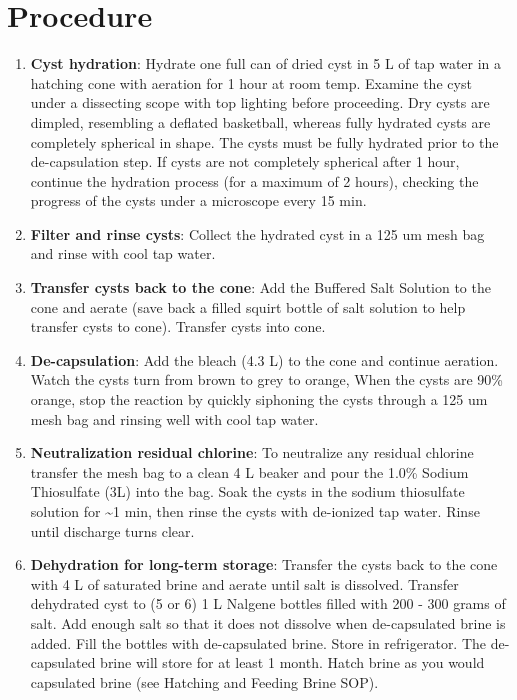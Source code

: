 \documentclass[
  letterpaper,
  DIV=11,
  numbers=noendperiod]{scrreprt}
\begin{document}
\hypertarget{procedure-28}{%
\section{Procedure}\label{procedure-28}}

\begin{enumerate}
\def\labelenumi{\arabic{enumi}.}
\item
  \textbf{Cyst hydration}: Hydrate one full can of dried cyst in 5 L of
  tap water in a hatching cone with aeration for 1 hour at room temp.
  Examine the cyst under a dissecting scope with top lighting before
  proceeding. Dry cysts are dimpled, resembling a deflated basketball,
  whereas fully hydrated cysts are completely spherical in shape. The
  cysts must be fully hydrated prior to the de-capsulation step. If
  cysts are not completely spherical after 1 hour, continue the
  hydration process (for a maximum of 2 hours), checking the progress of
  the cysts under a microscope every 15 min.
\item
  \textbf{Filter and rinse cysts}: Collect the hydrated cyst in a 125 um
  mesh bag and rinse with cool tap water.
\item
  \textbf{Transfer cysts back to the cone}: Add the Buffered Salt
  Solution to the cone and aerate (save back a filled squirt bottle of
  salt solution to help transfer cysts to cone). Transfer cysts into
  cone.
\item
  \textbf{De-capsulation}: Add the bleach (4.3 L) to the cone and
  continue aeration. Watch the cysts turn from brown to grey to orange,
  When the cysts are 90\% orange, stop the reaction by quickly siphoning
  the cysts through a 125 um mesh bag and rinsing well with cool tap
  water.
\item
  \textbf{Neutralization residual chlorine}: To neutralize any residual
  chlorine transfer the mesh bag to a clean 4 L beaker and pour the
  1.0\% Sodium Thiosulfate (3L) into the bag. Soak the cysts in the
  sodium thiosulfate solution for \textasciitilde1 min, then rinse the
  cysts with de-ionized tap water. Rinse until discharge turns clear.
\item
  \textbf{Dehydration for long-term storage}: Transfer the cysts back to
  the cone with 4 L of saturated brine and aerate until salt is
  dissolved. Transfer dehydrated cyst to (5 or 6) 1 L Nalgene bottles
  filled with 200 - 300 grams of salt. Add enough salt so that it does
  not dissolve when de-capsulated brine is added. Fill the bottles with
  de-capsulated brine. Store in refrigerator. The de-capsulated brine
  will store for at least 1 month. Hatch brine as you would capsulated
  brine (see Hatching and Feeding Brine SOP).
\end{enumerate}
\end{document}
